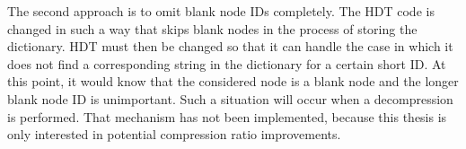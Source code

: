 The second approach is to omit blank node IDs completely. The HDT code is changed in such a way that skips blank nodes in the process of storing the dictionary. HDT must then be changed so that it can handle the case in which it does not find a corresponding string in the dictionary for a certain short ID. At this point, it would know that the considered node is a blank node and the longer blank node ID is unimportant. Such a situation will occur when a decompression is performed. That mechanism has not been implemented, because this thesis is only interested in potential compression ratio improvements.

















